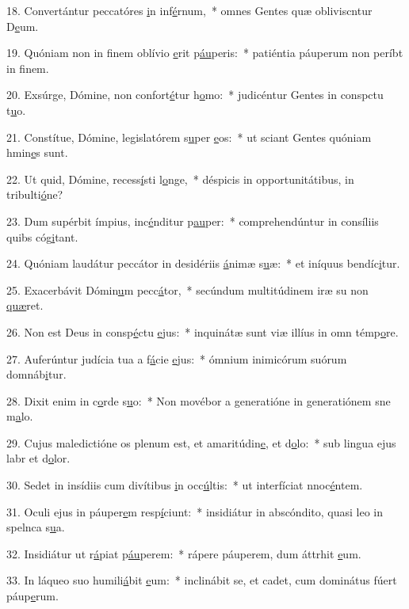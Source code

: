 18. Convertántur peccatóres \uline{i}n inf\uline{é}rnum,~* omnes Gentes quæ obliviscntur D\uline{e}um.\par 
19. Quóniam non in finem oblívio \uline{e}rit p\uline{áu}peris:~* patiéntia páuperum non períbt in f\uline{i}nem.\par 
20. Exsúrge, Dómine, non confort\uline{é}tur h\uline{o}mo:~* judicéntur Gentes in conspctu t\uline{u}o.\par 
21. Constítue, Dómine, legislatórem s\uline{u}per \uline{e}os:~* ut sciant Gentes quóniam hmin\uline{e}s sunt.\par 
22. Ut quid, Dómine, recess\uline{í}sti l\uline{o}nge,~* déspicis in opportunitátibus, in tribulti\uline{ó}ne?\par 
23. Dum supérbit ímpius, inc\uline{é}nditur p\uline{au}per:~* comprehendúntur in consíliis quibs cóg\uline{i}tant.\par 
24. Quóniam laudátur peccátor in desidériis \uline{á}nimæ s\uline{u}æ:~* et iníquus bendíc\uline{i}tur.\par 
25. Exacerbávit Dómin\uline{u}m pecc\uline{á}tor,~* secúndum multitúdinem iræ su non \uline{quæ}ret.\par 
26. Non est Deus in consp\uline{é}ctu \uline{e}jus:~* inquinátæ sunt viæ illíus in omn témp\uline{o}re.\par 
27. Auferúntur judícia tua a f\uline{á}cie \uline{e}jus:~* ómnium inimicórum suórum domnáb\uline{i}tur.\par 
28. Dixit enim in c\uline{o}rde s\uline{u}o:~* Non movébor a generatióne in generatiónem sne m\uline{a}lo.\par 
29. Cujus maledictióne os plenum est, et amaritúdin\uline{e}, et d\uline{o}lo:~* sub lingua ejus labr et d\uline{o}lor.\par 
30. Sedet in insídiis cum divítibus \uline{i}n occ\uline{ú}ltis:~* ut interfíciat nnoc\uline{é}ntem.\par 
31. Oculi ejus in páuper\uline{e}m resp\uline{í}ciunt:~* insidiátur in abscóndito, quasi leo in spelnca s\uline{u}a.\par 
32. Insidiátur ut r\uline{á}piat p\uline{áu}perem:~* rápere páuperem, dum áttrhit \uline{e}um.\par 
33. In láqueo suo humili\uline{á}bit \uline{e}um:~* inclinábit se, et cadet, cum dominátus fúert páup\uline{e}rum.\par 
